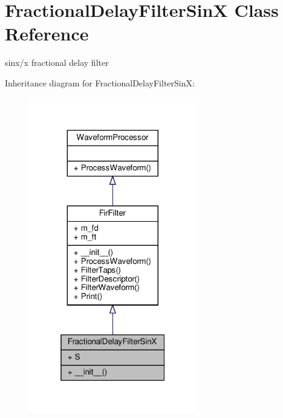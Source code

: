 \hypertarget{classSignalIntegrity_1_1TimeDomain_1_1Filters_1_1InterpolatorSinX_1_1FractionalDelayFilterSinX}{}\section{Fractional\+Delay\+Filter\+SinX Class Reference}
\label{classSignalIntegrity_1_1TimeDomain_1_1Filters_1_1InterpolatorSinX_1_1FractionalDelayFilterSinX}


sinx/x fractional delay filter  




Inheritance diagram for Fractional\+Delay\+Filter\+SinX\+:
\nopagebreak
\begin{figure}[H]
\begin{center}
\leavevmode
\includegraphics[width=208pt]{classSignalIntegrity_1_1TimeDomain_1_1Filters_1_1InterpolatorSinX_1_1FractionalDelayFilterSinX__inherit__graph}
\end{center}
\end{figure}


